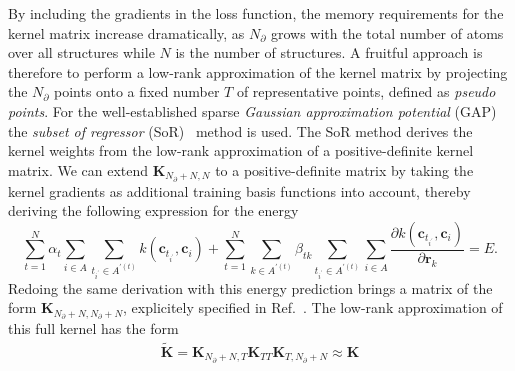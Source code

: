 By including the gradients in the loss function, the memory requirements for the kernel matrix increase dramatically, as $N_{\partial}$ grows with the total number of atoms over all structures while $N$ is the number of structures.
%
A fruitful approach is therefore to perform a low-rank approximation of the kernel matrix by projecting the $N_{\partial}$ points onto a fixed number $T$ of representative points, defined as \emph{pseudo points}.
For the well-established sparse \emph{Gaussian approximation potential} (GAP)~\cite{bartok2010gaussian} the \emph{subset of regressor} (SoR)~\cite{wahba1998bias,smola2000sparse,quinonero2005unifying} method is used.
The SoR method derives the kernel weights from the low-rank approximation of a positive-definite kernel matrix.
We can extend $\mathbf{K}_{N_{\partial}+N,N}$ to a positive-definite matrix by taking the kernel gradients as additional training basis functions into account, thereby deriving the following expression for the energy
\begin{equation}
  \sum_{t=1}^N \alpha_t \sum_{i\in A} \sum_{t_{i^\prime}\in A^{\prime(t)}} k(\mathbf{c}_{t_{i^\prime}}, \mathbf{c}_{i}) + \sum_{t=1}^{N}\sum_{k\in A^{\prime(t)}}\beta_{tk} \sum_{t_{i^\prime}\in A^{\prime(t)}}\sum_{i\in A} \frac{\partial k(\mathbf{c}_{t_{i^\prime}}, \mathbf{c}_{i})}{\partial\mathbf{r}_k} = E.
\end{equation}
Redoing the same derivation with this energy prediction brings a matrix of the form $\mathbf{K}_{N_{\partial}+N,N_{\partial}+N}$, explicitely specified in Ref.~\cite{bartok2015gaptutorial}.
The low-rank approximation of this full kernel has the form
\begin{subequations}
\begin{align}
  \tilde{\mathbf{K}} = \mathbf{K}^{\phantom{1}}_{N_{\partial}+N,T}\mathbf{K}^{\phantom{1}}_{TT}\mathbf{K}_{T,N_{\partial}+N} \approx \mathbf{K}%
\end{align}
\end{subequations}
